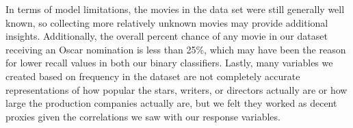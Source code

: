 \documentclass[10pt]{article}
\begin{document}
In terms of model limitations, the movies in the data set were still generally well known, so collecting more relatively unknown movies may provide additional insights. Additionally, the overall percent chance of any movie in our dataset receiving an Oscar nomination is less than 25\%, which may have been the reason for lower recall values in both our binary classifiers. Lastly, many variables we created based on frequency in the dataset are not completely accurate representations of how popular the stars, writers, or directors actually are or how large the production companies actually are, but we felt they worked as decent proxies given the correlations we saw with our response variables.


 
\end{document}
